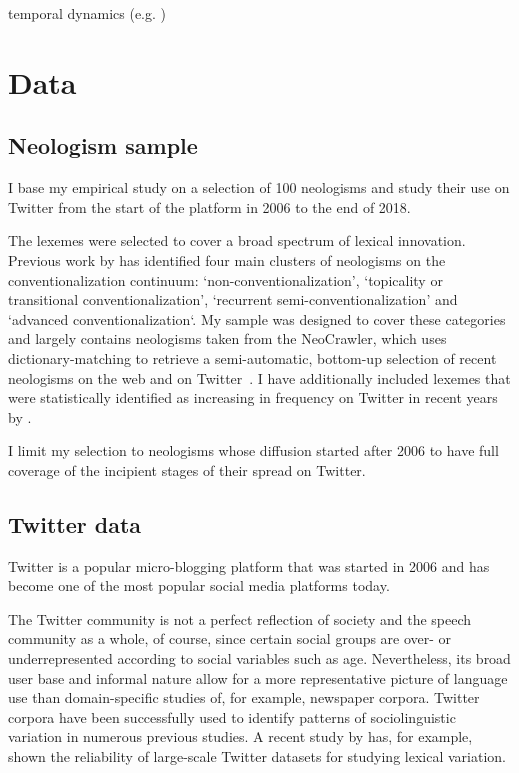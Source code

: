 \documentclass[draft, a4paper, abstract=on]{scrartcl}
\begin{document}
  temporal dynamics (e.g. )


\section{Data}

  \subsection{Neologism sample}

  I base my empirical study on a selection of 100 neologisms and study their use on Twitter from the start of the platform in 2006 to the end of 2018.

  The lexemes were selected to cover a broad spectrum of lexical innovation. Previous work by \textcite[115--147]{Kerremans2015WebNew} has identified four main clusters of neologisms on the conventionalization continuum: `non-conventionalization', `topicality or transitional conventionalization', `recurrent semi-conventionalization' and `advanced conventionalization`. My sample was designed to cover these categories and largely contains neologisms taken from the NeoCrawler, which uses dictionary-matching to retrieve a semi-automatic, bottom-up selection of recent neologisms on the web and on Twitter~\parencite{Kerremans2019UsingDatamining}. I have additionally included lexemes that were statistically identified as increasing in frequency on Twitter in recent years by \textcite{Grieve2016AnalyzingLexical}.

  I limit my selection to neologisms whose diffusion started after 2006 to have full coverage of the incipient stages of their spread on Twitter.

  \subsection{Twitter data}

    Twitter is a popular micro-blogging platform that was started in 2006 and has become one of the most popular social media platforms today.

    The Twitter community is not a perfect reflection of society and the speech community as a whole, of course, since certain social groups are over- or underrepresented according to social variables such as age. Nevertheless, its broad user base and informal nature allow for a more representative picture of language use than domain-specific studies of, for example, newspaper corpora. Twitter corpora have been successfully used to identify patterns of sociolinguistic variation in numerous previous studies. A recent study by \textcite{Grieve2019MappingLexical} has, for example, shown the reliability of large-scale Twitter datasets for studying lexical variation.
\end{document}
